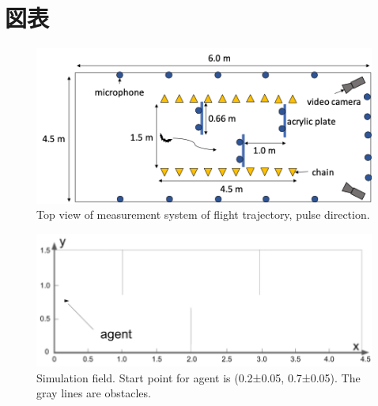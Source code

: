 \documentclass[main]{subfiles}
\begin{document}
\newpage
\chapter*{図表}

\renewcommand{\figurename}{Fig. } %
\renewcommand{\tablename}{Table } %

\makeatletter
{}
\makeatother

\def\thefigure{\arabic{figure}}
\def\thetable{\arabic{table}}


\begin{figure}[H]
  \centering
  \includegraphics[width=15cm]{figures/top_view_measure.png}
  \caption{
    Top view of measurement system of flight trajectory,
    pulse direction.
  }
  \label{fig:top_view_measure}
\end{figure}

\newpage
{}
\begin{figure}[H]
  \centering
  \vfill
  \includegraphics[width=15cm]{figures/simulation_field.png}
  \caption{
    Simulation field.
    Start point for agent is (0.2±0.05, 0.7±0.05).
    The gray lines are obstacles.
  }\label{fig:simulation_field}
\end{figure}
\end{document}
